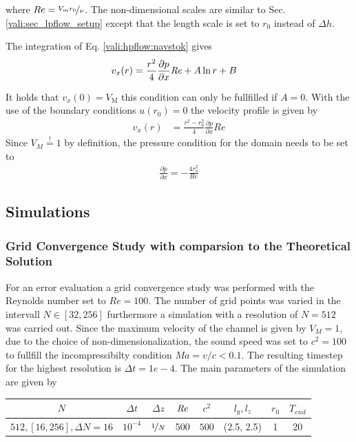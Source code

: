 where $Re = \nicefrac{V_{m}r_0}{\nu}$.
The non-dimensional scales are similar to Sec. \ref{vali:sec_lpflow_setup}  except that the length scale is set to $r_0$ instead of $\Delta h$.

The integration of Eq. \ref{vali:hpflow:navstok} gives
\begin{align}
    v_x(r) &= \frac{r^2}{4}\frac{\partial p}{\partial x}\mbox{\textit{Re}} + A \ln r + B
\end{align}

It holds that $v_x(0)= V_{\text{M}}$ this condition can only be fullfilled if $A=0$.
With the use of the boundary conditions $u(r_0) = 0$ the velocity profile is given by
\begin{align}
    v_x(r) &= \frac{r^2 - r_0^2}{4}\frac{\partial p}{\partial x}Re
\end{align}
Since $V_{M} \stackrel{!}{=} 1$ by definition, the pressure condition for the domain needs to be set to
\begin{align}
    \frac{\partial p}{\partial x} = -\frac{4 r_o^2}{Re}
\end{align}

\subsection{Simulations}
\label{vali:hpflow_simsetups}

\subsubsection{Grid Convergence Study with comparsion to the Theoretical Solution}

For an error evaluation a grid convergence study was performed with the Reynolds number set to $Re=100$.
The number of grid points was varied in the intervall $N\in[32, 256]$ furthermore a
simulation with a resolution of $N=512$ was carried out.
Since the maximum velocity of the channel is given by $V_{M}=1$, due to the choice of non-dimensionalization,
the sound speed was set to $c^2 = 100$ to fullfill the incompressibilty condition $Ma = v/c < 0.1$.
The resulting timestep for the highest resolution is $\Delta t = 1e-4$.
The main parameters of the simulation are  given by

\begin{center}
\vspace*{0.7ex}
\begin{tabular}{c|c|c|c|c|c|c|c }
 $ N  $                   & $\Delta t$ & $\Delta z$            & $\mbox{\textit{Re}}$  & $c^2$   & $l_y, l_z$ & $r_0$ & $T_{end}$\\
\hline
 $512, [16, 256], \Delta N = 16 $& $10^{-4}$ & $\nicefrac{1}{N}$ & 500     & $500$   & (2.5, 2.5) & 1     & 20\\
\end{tabular}
\vspace*{0.7ex}
\end{center}

